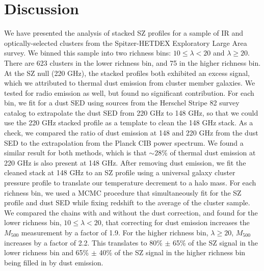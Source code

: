 \documentclass[a4paper,fleqn,usenatbib]{mnras}
\begin{document}
\section{Discussion} \label{sec:conclusions}
We have presented the analysis of stacked SZ profiles for a sample of IR and optically-selected clusters from the Spitzer-HETDEX Exploratory Large Area survey. We binned this sample into two richness bins: $10 \leq \lambda < 20$ and $\lambda \geq 20$. There are 623 clusters in the lower richness bin, and 75 in the higher richness bin. 
At the SZ null (220 GHz), the stacked profiles both exhibited an excess signal, which we attributed to thermal dust emission from cluster member galaxies. We tested for radio emission as well, but found no significant contribution.  For each bin, we fit for a dust SED using sources from the Herschel Stripe 82 survey catalog to extrapolate the dust SED from 220 GHz to 148 GHz, so that we could use the 220 GHz stacked profile as a template to clean the 148 GHz stack. As a check, we compared the ratio of dust emission at 148 and 220 GHz from the dust SED to the extrapolation from the Planck CIB power spectrum. We found a similar result for both methods, which is that $\sim28\%$ of thermal dust emission at 220 GHz is also present at 148 GHz. 
After removing dust emission, we fit the cleaned stack at 148 GHz to an SZ profile using a universal galaxy cluster pressure profile to translate our temperature decrement to a halo mass. For each richness bin, we used a MCMC procedure that simultaneously fit for the SZ profile and dust SED while fixing redshift to the average of the cluster sample.  We compared the chains with and without the dust correction, and found for the lower richness bin, $10 \leq \lambda < 20$, that correcting for dust emission increases the $M_{500}$ measurement by a factor of 1.9. For the higher richness bin, $\lambda 
\geq 20$, $M_{500}$ increases by a factor of 2.2. This translates to 80\% $\pm$ 65\% of the SZ signal in the lower richness bin and 65\% $\pm$ 40\% of the SZ signal in the higher richness bin being filled in by dust emission. 
\end{document}
